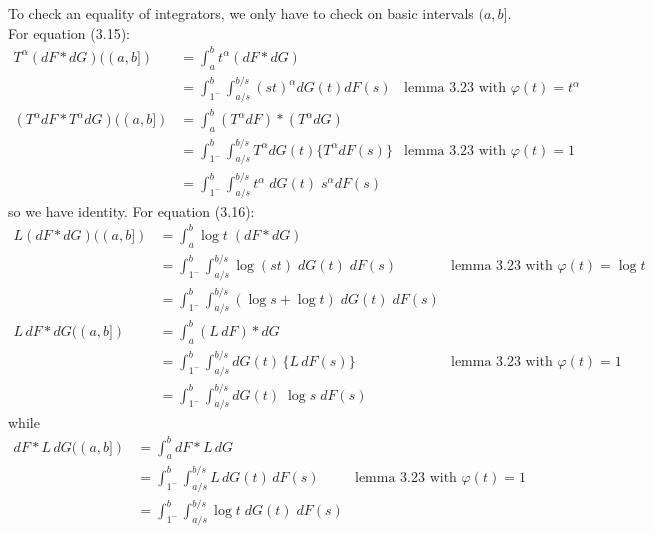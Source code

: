 \documentclass{article}
\begin{document}
To check an equality of integrators, we only have to check on basic intervals $(a, b]$. For equation (3.15):
\begin{align*}
T^\alpha(dF * dG) ((a, b]) &= \int_a^b t^\alpha (dF * dG)\\
&= \int_{1^-}^b \int_{a/s}^{b/s} (st)^\alpha dG(t) dF(s) &\text{lemma 3.23 with } \varphi(t) = t^\alpha\\
(T^\alpha dF * T^\alpha dG)((a, b]) &= \int_a^b (T^\alpha dF) * (T^\alpha dG)\\
&= \int_{1^-}^b \int_{a/s}^{b/s} T^\alpha dG(t) \{T^\alpha dF(s)\} &\text{lemma 3.23 with } \varphi(t) = 1\\
&= \int_{1^-}^b \int_{a/s}^{b/s} t^\alpha \; dG(t) \; s^\alpha dF(s)
\end{align*}
so we have identity. For equation (3.16):
\begin{align*}
L(dF * dG) ((a, b]) &= \int_a^b \log t \; (dF * dG)\\
&= \int_{1^-}^b \int_{a/s}^{b/s} \log (st) \; dG(t) \; dF(s) &\text{lemma 3.23 with } \varphi(t) = \log t\\
&= \int_{1^-}^b \int_{a/s}^{b/s} (\log s + \log t) \; dG(t) \; dF(s)\\
L \, dF * dG ((a, b]) &= \int_a^b (L \, dF) * dG\\
&= \int_{1^-}^b \int_{a/s}^{b/s} dG(t) \, \{L \, dF(s)\} &\text{lemma 3.23 with } \varphi(t) = 1\\
&= \int_{1^-}^b \int_{a/s}^{b/s} dG(t) \; \log s \; dF(s)
\end{align*}
while
\begin{align*}
dF * L \, dG ((a, b]) &= \int_a^b dF * L \, dG\\
&= \int_{1^-}^b \int_{a/s}^{b/s} L\, dG(t) \, dF(s) &\text{lemma 3.23 with } \varphi(t) = 1\\
&= \int_{1^-}^b \int_{a/s}^{b/s} \log t \; dG(t) \; dF(s)
\end{align*}

\unless\ifdefined\IsMainDocument
\end{document}
